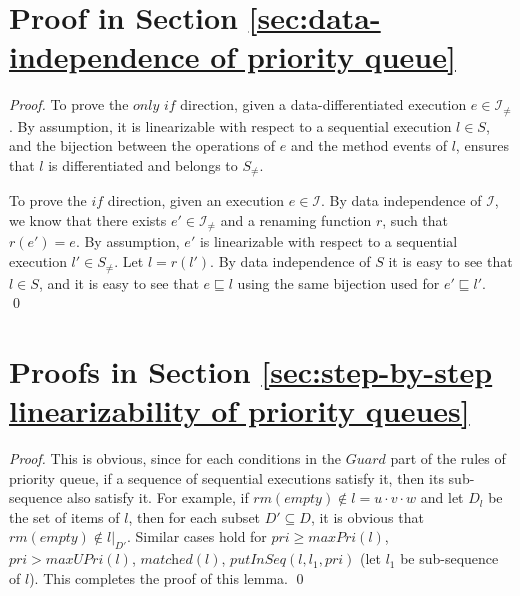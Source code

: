 \section{Proof in Section \ref{sec:data-independence of priority queue}}
\label{sec:appendix in section data-independence of PQ}


\DataDifferentiatedisEnoughforPQ*

\begin {proof}

To prove the $\textit{only if}$ direction, given a data-differentiated execution $e \in \mathcal{I}_{\neq}$. By assumption, it is linearizable with respect to a sequential execution $l \in S$, and the bijection between the operations of $e$ and the method events of $l$, ensures that $l$ is differentiated and belongs to $S_{\neq}$.

To prove the $\textit{if}$ direction, given an execution $e \in \mathcal{I}$. By data independence of $\mathcal{I}$, we know that there exists $e' \in \mathcal{I}_{\neq}$ and a renaming function $r$, such that $r(e') = e$. By assumption, $e'$ is linearizable with respect to a sequential execution $l' \in S_{\neq}$. Let $l=r(l')$. By data independence of $S$ it is easy to see that $l \in S$, and it is easy to see that $e \sqsubseteq l$  using the same bijection used for $e' \sqsubseteq l'$. \qed
\end {proof}





\section{Proofs in Section \ref{sec:step-by-step linearizability of priority queues}}
\label{sec:appendix in section step-by-step linearizability of priority queues}

\PQisClosedUnderProjection*

\begin {proof}

This is obvious, since for each conditions in the $\textit{Guard}$ part of the rules of priority queue, if a sequence of sequential executions satisfy it, then its sub-sequence also satisfy it. For example, if $\textit{rm}(\textit{empty}) \notin l = u \cdot v \cdot w$ and let $D_l$ be the set of items of $l$, then for each subset $D' \subseteq D$, it is obvious that $\textit{rm}(\textit{empty}) \notin l \vert_{ D' }$. Similar cases hold for $\textit{pri} \geq \textit{maxPri}(l)$, $\textit{pri} > \textit{maxUPri}(l)$, $\textit{matched}(l)$, $\textit{putInSeq}(l,l_1,\textit{pri})$ (let $l_1$ be sub-sequence of $l$). This completes the proof of this lemma. \qed
\end {proof}


